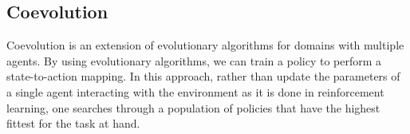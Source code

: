 \subsection{Coevolution}
Coevolution is an extension of evolutionary algorithms for domains with multiple agents. By using evolutionary algorithms, we can train a policy to perform a state-to-action mapping. In this approach, rather than update the parameters of a single agent interacting with the environment as it is done in reinforcement learning, one searches through a population of policies that have the highest fittest for the task at hand.